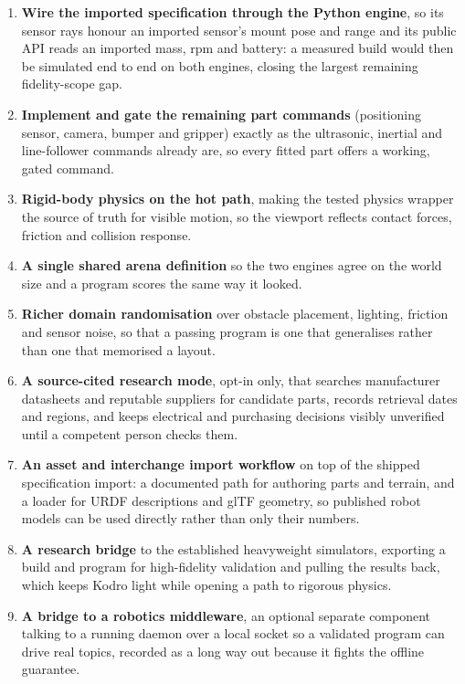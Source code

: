 \documentclass[11pt,a4paper]{report}
\begin{document}
\begin{enumerate}
\item {} \textbf{Wire the imported specification through the Python engine}, so its sensor rays honour an imported sensor's mount pose and range and its public API reads an imported mass, rpm and battery: a measured build would then be simulated end to end on both engines, closing the largest remaining fidelity-scope gap.
\item {} \textbf{Implement and gate the remaining part commands} (positioning sensor, camera, bumper and gripper) exactly as the ultrasonic, inertial and line-follower commands already are, so every fitted part offers a working, gated command.
\item \textbf{Rigid-body physics on the hot path}, making the tested physics wrapper the source of truth for visible motion, so the viewport reflects contact forces, friction and collision response.
\item \textbf{A single shared arena definition} so the two engines agree on the world size and a program scores the same way it looked.
\item \textbf{Richer domain randomisation} over obstacle placement, lighting, friction and sensor noise, so that a passing program is one that generalises rather than one that memorised a layout.
\item {} \textbf{A source-cited research mode}, opt-in only, that searches manufacturer datasheets and reputable suppliers for candidate parts, records retrieval dates and regions, and keeps electrical and purchasing decisions visibly unverified until a competent person checks them.
\item {} \textbf{An asset and interchange import workflow} on top of the shipped specification import: a documented path for authoring parts and terrain, and a loader for URDF descriptions and glTF geometry, so published robot models can be used directly rather than only their numbers.
\item {} \textbf{A research bridge} to the established heavyweight simulators, exporting a build and program for high-fidelity validation and pulling the results back, which keeps Kodro light while opening a path to rigorous physics.
\item {} \textbf{A bridge to a robotics middleware}, an optional separate component talking to a running daemon over a local socket so a validated program can drive real topics, recorded as a long way out because it fights the offline guarantee.

\end{enumerate}
\end{document}

